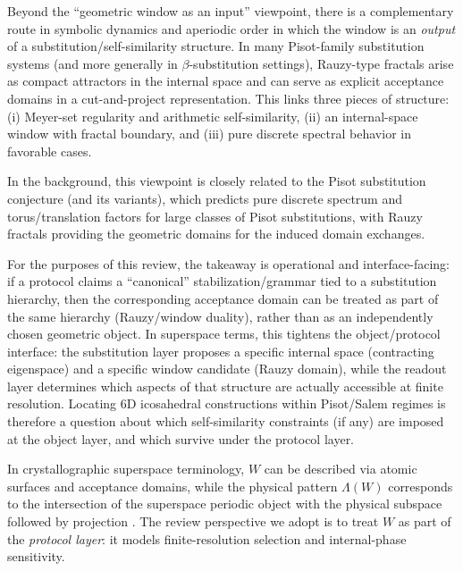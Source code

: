 \begin{remark}\label{rem:rauzy-windows}
Beyond the ``geometric window as an input'' viewpoint, there is a complementary route in symbolic dynamics and aperiodic order in which the window is an \emph{output} of a substitution/self-similarity structure. In many Pisot-family substitution systems (and more generally in $\beta$-substitution settings), Rauzy-type fractals arise as compact attractors in the internal space and can serve as explicit acceptance domains in a cut-and-project representation. This links three pieces of structure: (i) Meyer-set regularity and arithmetic self-similarity, (ii) an internal-space window with fractal boundary, and (iii) pure discrete spectral behavior in favorable cases.\cite{BertheYassawi2024,Queffelec2010,BaakeGrimm2013}

In the background, this viewpoint is closely related to the Pisot substitution conjecture (and its variants), which predicts pure discrete spectrum and torus/translation factors for large classes of Pisot substitutions, with Rauzy fractals providing the geometric domains for the induced domain exchanges.\cite{ArnouxIto2001PisotRauzy}

For the purposes of this review, the takeaway is operational and interface-facing: if a protocol claims a ``canonical'' stabilization/grammar tied to a substitution hierarchy, then the corresponding acceptance domain can be treated as part of the same hierarchy (Rauzy/window duality), rather than as an independently chosen geometric object. In superspace terms, this tightens the object/protocol interface: the substitution layer proposes a specific internal space (contracting eigenspace) and a specific window candidate (Rauzy domain), while the readout layer determines which aspects of that structure are actually accessible at finite resolution. Locating 6D icosahedral constructions within Pisot/Salem regimes is therefore a question about which self-similarity constraints (if any) are imposed at the object layer, and which survive under the protocol layer.
\end{remark}

In crystallographic superspace terminology, $W$ can be described via atomic surfaces and acceptance domains, while the physical pattern $\Lambda(W)$ corresponds to the intersection of the superspace periodic object with the physical subspace followed by projection \cite{Janssen2007,Steurer2012}. The review perspective we adopt is to treat $W$ as part of the \emph{protocol layer}: it models finite-resolution selection and internal-phase sensitivity.

